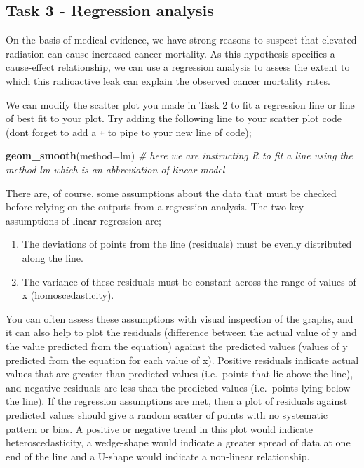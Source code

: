 \documentclass[
]{book}
\newenvironment{Shaded}{\begin{snugshade}}{\end{snugshade}}
\newcommand{\AttributeTok}[1]{\textcolor[rgb]{0.13,0.29,0.53}{#1}}
\newcommand{\CommentTok}[1]{\textcolor[rgb]{0.56,0.35,0.01}{\textit{#1}}}
\newcommand{\FunctionTok}[1]{\textcolor[rgb]{0.13,0.29,0.53}{\textbf{#1}}}
\newcommand{\NormalTok}[1]{#1}
\newcommand{\StringTok}[1]{\textcolor[rgb]{0.31,0.60,0.02}{#1}}
\providecommand{\tightlist}{%
  \setlength{\itemsep}{0pt}\setlength{\parskip}{0pt}}
\begin{document}
\subsection{Task 3 - Regression analysis}\label{c6t3}

On the basis of medical evidence, we have strong reasons to suspect that elevated radiation can cause increased cancer mortality. As this hypothesis specifies a cause-effect relationship, we can use a regression analysis to assess the extent to which this radioactive leak can explain the observed cancer mortality rates.

We can modify the scatter plot you made in Task 2 to fit a regression line or line of best fit to your plot. Try adding the following line to your scatter plot code (dont forget to add a \texttt{+} to pipe to your new line of code);

\begin{Shaded}
\begin{Highlighting}[]
 \FunctionTok{geom\_smooth}\NormalTok{(}\AttributeTok{method=}\StringTok{\textquotesingle{}lm\textquotesingle{}}\NormalTok{)}
\CommentTok{\# here we are instructing R to fit a line using the method \textasciigrave{}lm\textasciigrave{} which is an abbreviation of linear model}
\end{Highlighting}
\end{Shaded}

There are, of course, some assumptions about the data that must be checked before relying on the outputs from a regression analysis. The two key assumptions of linear regression are;

\begin{enumerate}
\def\labelenumi{\arabic{enumi})}
\tightlist
\item
  The deviations of points from the line (residuals) must be evenly distributed along the line.
\item
  The variance of these residuals must be constant across the range of values of x (homoscedasticity).
\end{enumerate}

You can often assess these assumptions with visual inspection of the graphs, and it can also help to plot the residuals (difference between the actual value of y and the value predicted from the equation) against the predicted values (values of y predicted from the equation for each value of x). Positive residuals indicate actual values that are greater than predicted values (i.e.~points that lie above the line), and negative residuals are less than the predicted values (i.e.~points lying below the line). If the regression assumptions are met, then a plot of residuals against predicted values should give a random scatter of points with no systematic pattern or bias. A positive or negative trend in this plot would indicate heteroscedasticity, a wedge-shape would indicate a greater spread of data at one end of the line and a U-shape would indicate a non-linear relationship.
\end{document}
